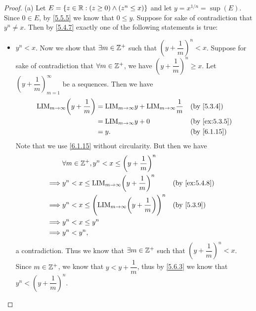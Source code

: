 \begin{proof}{(a)}
  Let \(E = \left\lbrace z \in \mathbb{R} : (z \geq 0) \land (z^n \leq x)\right\rbrace\) and let \(y = x^{1 / n} = \sup(E)\).
  Since \(0 \in E\), by \cref{5.5.5} we know that \(0 \leq y\).
  Suppose for sake of contradiction that \(y^n \neq x\).
  Then by \cref{5.4.7} exactly one of the following statements is true:
  \begin{itemize}
    \item \(y^n < x\).
          Now we show that \(\exists m \in \mathbb{Z}^+\) such that \((y + \dfrac{1}{m})^n < x\).
          Suppose for sake of contradiction that \(\forall m \in \mathbb{Z}^+\), we have \((y + \dfrac{1}{m})^n \geq x\).
          Let \((y + \dfrac{1}{m})_{m = 1}^\infty\) be a sequences.
          Then we have
          \begin{align*}
            \text{LIM}_{m \to \infty} \bigg(y + \dfrac{1}{m}\bigg) & = \text{LIM}_{m \to \infty} y + \text{LIM}_{m \to \infty} \dfrac{1}{m} &  & \by{5.3.4}    \\
                                                                   & = \text{LIM}_{m \to \infty} y + 0                                      &  & \by{ex:5.3.5} \\
                                                                   & = y.                                                                   &  & \by{6.1.15}
          \end{align*}
          Note that we use \cref{6.1.15} without circularity.
          But then we have
          \begin{align*}
                     & \forall m \in \Z^+, y^n < x \leq \bigg(y + \dfrac{1}{m}\bigg)^n                                      \\
            \implies & y^n < x \leq \text{LIM}_{m \to \infty} \bigg(y + \dfrac{1}{m}\bigg)^n             &  & \by{ex:5.4.8} \\
            \implies & y^n < x \leq \Bigg(\text{LIM}_{m \to \infty} \bigg(y + \dfrac{1}{m}\bigg)\Bigg)^n &  & \by{5.3.9}    \\
            \implies & y^n < x \leq y^n                                                                                     \\
            \implies & y^n < y^n,
          \end{align*}
          a contradiction.
          Thus we know that \(\exists m \in \mathbb{Z}^+\) such that \((y + \dfrac{1}{m})^n < x\).
          Since \(m \in \mathbb{Z}^+\), we know that \(y < y + \dfrac{1}{m}\), thus by \cref{5.6.3} we know that \(y^n < (y + \dfrac{1}{m})^n\).

\end{itemize}
\end{proof}
